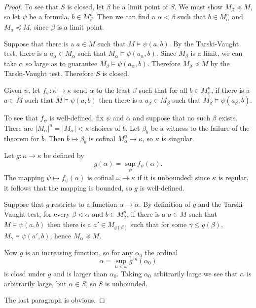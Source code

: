\documentclass[12pt]{report}
\theoremstyle{definition}
\begin{document}
\begin{proof}
To see that $S$ is closed, let $\beta$ be a limit point of $S$. We must show $M_\beta \preceq M$, so let $\psi$ be a formula, $b \in M_\beta^n$. Then we can find a $\alpha < \beta$ such that $b \in M_\alpha^n$ and $M_\alpha \preceq M$, since $\beta$ is a limit point.

Suppose that there is a $a \in M$ such that $M \models \psi(a, b)$. By the Tarski-Vaught test, there is a $a_\alpha \in M_\alpha$ such that $M_\alpha \models \psi(a_\alpha, b)$. Since $M_\beta$ is a limit, we can take $\alpha$ so large as to guarantee $M_\beta \models \psi(a_\alpha, b)$. Therefore $M_\beta \preceq M$ by the Tarski-Vaught test. Therefore $S$ is closed.

Given $\psi$, let $f_\psi: \kappa \to \kappa$ send $\alpha$ to the least $\beta$ such that for all $b \in M_\alpha^n$, if there is a $a \in M$ such that $M \models \psi(a, b)$ then there is a $a_\beta \in M_\beta$ such that $M_\beta \models \psi(a_\beta, b)$.

To see that $f_\psi$ is well-defined, fix $\psi$ and $\alpha$ and suppose that no such $\beta$ exists. There are $|M_\alpha|^n = |M_\alpha| < \kappa$ choices of $b$. Let $\beta_b$ be a witness to the failure of the theorem for $b$. Then $b \mapsto \beta_b$ is cofinal $M_\alpha^n \to \kappa$, so $\kappa$ is singular.

Let $g: \kappa \to \kappa$ be defined by
$$g(\alpha) = \sup_\psi f_\psi(\alpha).$$
The mapping $\psi \mapsto f_\psi(\alpha)$ is cofinal $\omega \to \kappa$ if it is unbounded; since $\kappa$ is regular, it follows that the mapping is bounded, so $g$ is well-defined.

Suppose that $g$ restricts to a function $\alpha \to \alpha$. By definition of $g$ and the Tarski-Vaught test, for every $\beta < \alpha$ and $b \in M_\beta^n$, if there is a $a \in M$ such that $M \models \psi(a, b)$ then there is a $a' \in M_{g(\beta)}$ such that for some $\gamma \leq g(\beta)$, $M_\gamma \models \psi(a', b)$, hence $M_\alpha \preceq M$.

Now $g$ is an increasing function, so for any $\alpha_0$ the ordinal
$$\alpha = \sup_{n < \omega} g^{\circ n}(\alpha_0)$$
is closd under $g$ and is larger than $\alpha_0$. Taking $\alpha_0$ arbitrarily large we see that $\alpha$ is arbitrarily large, but $\alpha \in S$, so $S$ is unbounded.

The last paragraph is obvious.
\end{proof}
\end{document}
